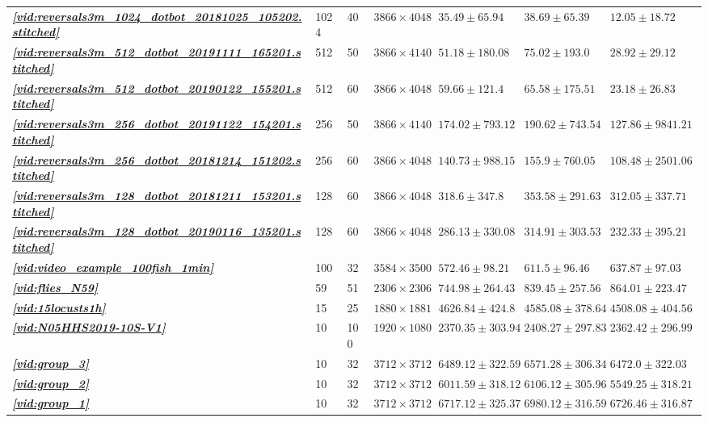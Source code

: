 \documentclass[9pt,lineno]{elife}
\newcommand{\vidref}[1]{\textit{\textbf{\ref{#1}}}}
\begin{document}
\begin{table}[h]
\begin{tabular}{l l l l | l l l l}
\vidref{vid:reversals3m_1024_dotbot_20181025_105202.stitched} & 1024 & 40 & $ 3866 \times 4048 $ & $ 35.49 \pm 65.94 $ & $ 38.69 \pm 65.39 $ & $ 12.05 \pm 18.72 $ \\
\vidref{vid:reversals3m_512_dotbot_20191111_165201.stitched} & 512 & 50 & $ 3866 \times 4140 $ & $ 51.18 \pm 180.08 $ & $ 75.02 \pm 193.0 $ & $ 28.92 \pm 29.12 $ \\
\vidref{vid:reversals3m_512_dotbot_20190122_155201.stitched} & 512 & 60 & $ 3866 \times 4048 $ & $ 59.66 \pm 121.4 $ & $ 65.58 \pm 175.51 $ & $ 23.18 \pm 26.83 $ \\
\vidref{vid:reversals3m_256_dotbot_20191122_154201.stitched} & 256 & 50 & $ 3866 \times 4140 $ & $ 174.02 \pm 793.12 $ & $ 190.62 \pm 743.54 $ & $ 127.86 \pm 9841.21 $ \\
\vidref{vid:reversals3m_256_dotbot_20181214_151202.stitched} & 256 & 60 & $ 3866 \times 4048 $ & $ 140.73 \pm 988.15 $ & $ 155.9 \pm 760.05 $ & $ 108.48 \pm 2501.06 $ \\
\vidref{vid:reversals3m_128_dotbot_20181211_153201.stitched} & 128 & 60 & $ 3866 \times 4048 $ & $ 318.6 \pm 347.8 $ & $ 353.58 \pm 291.63 $ & $ 312.05 \pm 337.71 $ \\
\vidref{vid:reversals3m_128_dotbot_20190116_135201.stitched} & 128 & 60 & $ 3866 \times 4048 $ & $ 286.13 \pm 330.08 $ & $ 314.91 \pm 303.53 $ & $ 232.33 \pm 395.21 $ \\
\vidref{vid:video_example_100fish_1min} & 100 & 32 & $ 3584 \times 3500 $ & $ 572.46 \pm 98.21 $ & $ 611.5 \pm 96.46 $ & $ 637.87 \pm 97.03 $ \\
\vidref{vid:flies_N59} & 59 & 51 & $ 2306 \times 2306 $ & $ 744.98 \pm 264.43 $ & $ 839.45 \pm 257.56 $ & $ 864.01 \pm 223.47 $ \\
\vidref{vid:15locusts1h} & 15 & 25 & $ 1880 \times 1881 $ & $ 4626.84 \pm 424.8 $ & $ 4585.08 \pm 378.64 $ & $ 4508.08 \pm 404.56 $ \\
\vidref{vid:N05HHS2019-10S-V1} & 10 & 100 & $ 1920 \times 1080 $ & $ 2370.35 \pm 303.94 $ & $ 2408.27 \pm 297.83 $ & $ 2362.42 \pm 296.99 $ \\
\vidref{vid:group_3} & 10 & 32 & $ 3712 \times 3712 $ & $ 6489.12 \pm 322.59 $ & $ 6571.28 \pm 306.34 $ & $ 6472.0 \pm 322.03 $ \\
\vidref{vid:group_2} & 10 & 32 & $ 3712 \times 3712 $ & $ 6011.59 \pm 318.12 $ & $ 6106.12 \pm 305.96 $ & $ 5549.25 \pm 318.21 $ \\
\vidref{vid:group_1} & 10 & 32 & $ 3712 \times 3712 $ & $ 6717.12 \pm 325.37 $ & $ 6980.12 \pm 316.59 $ & $ 6726.46 \pm 316.87 $ \\

\end{tabular}
\end{table}
\end{document}
